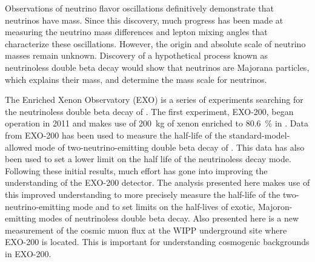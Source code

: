 Observations of neutrino flavor oscillations definitively demonstrate that neutrinos have mass. Since this discovery, much progress has been made at measuring the neutrino mass differences and lepton mixing angles that characterize these oscillations. However, the origin and absolute scale of neutrino masses remain unknown. Discovery of a hypothetical process known as neutrinoless double beta decay would show that neutrinos are Majorana particles, which explains their mass, and determine the mass scale for neutrinos.

The Enriched Xenon Observatory (EXO) is a series of experiments searching for the neutrinoless double beta decay of . The first experiment, EXO-200, began operation in 2011 and makes use of \SI{200}{\kg} of xenon enriched to \SI{80.6}{\percent} in . Data from EXO-200 has been used to measure the half-life of the standard-model-allowed mode of two-neutrino-emitting double beta decay of . This data has also been used to set a lower limit on the half life of the neutrinoless decay mode. Following these initial results, much effort has gone into improving the understanding of the EXO-200 detector. The analysis presented here makes use of this improved understanding to more precisely measure the half-life of the two-neutrino-emitting mode and to set limits on the half-lives of exotic, Majoron-emitting modes of neutrinoless double beta decay. Also presented here is a new measurement of the cosmic muon flux at the WIPP underground site where EXO-200 is located. This is important for understanding cosmogenic backgrounds in EXO-200.
